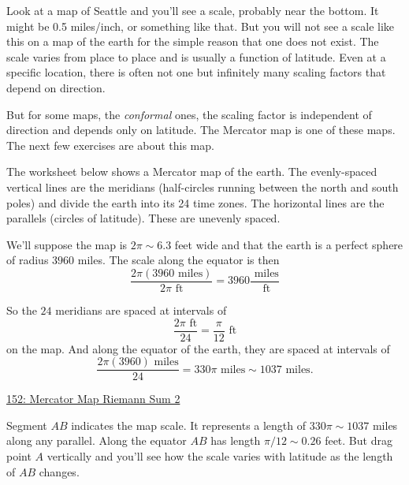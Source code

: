 \documentclass{ximera}
\begin{document}
Look at a map of Seattle and you’ll see a scale, probably near the bottom. It might be 0.5 miles/inch, or something like that. But you will not see a scale like this on a map of the earth for the simple reason that one does not exist. The scale varies from place to place and is usually a function of latitude. Even at a specific location, there is often not one but infinitely many scaling factors that depend on direction.

But for some maps, the \emph{conformal} ones, the scaling factor is independent of direction and depends only on latitude. The Mercator map is one of these maps. The next few exercises are about this map.

\begin{exercise} \label{EXYYYergbfg}
The worksheet below shows a Mercator map of the earth. The evenly-spaced vertical lines are the meridians (half-circles running between the north and south poles) and divide the earth into its 24 time zones. The horizontal lines are the parallels (circles of latitude). These are unevenly spaced.

We'll suppose the map is $2\pi \sim 6.3$ feet wide and that the earth is a perfect sphere of radius $3960$ miles. The scale along the equator is then
\[
      \frac{2\pi (3960 \text{ miles})}{2\pi \text{ ft} } = 3960 \frac{\text{ miles}}{\text{ ft}} 
\]

So the $24$ meridians are spaced at intervals of 
\[
    \frac{2\pi \text{ ft}}{24}  = \frac{\pi}{12} \text{ ft}
\] 
on the map. And along the equator of the earth, they are spaced at intervals of
\[ 
          \frac{2\pi (3960) \text{ miles}}{24} = 330\pi\text{ miles} \sim 1037 \text{ miles}. 
\]

\begin{onlineOnly}
    \begin{center}
\end{center}
\end{onlineOnly}

\href{https://www.desmos.com/calculator/cr8vg7urnc}{152: Mercator Map Riemann Sum 2}

Segment $AB$ indicates the map scale.  It represents a length of $330\pi \sim 1037$ miles along any parallel. Along the equator $AB$ has length $\pi/12 \sim 0.26$ feet. But drag point $A$ vertically and you'll see how the scale varies with latitude as the length of $AB$ changes. 

\end{exercise}
\end{document}
